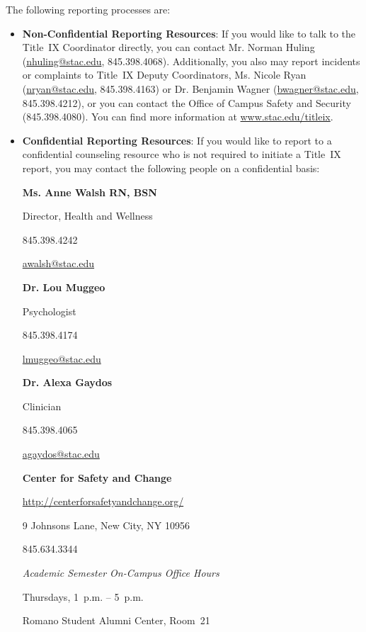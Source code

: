 \documentclass[11pt,letterpaper]{article}
\begin{document}
The following reporting processes are:
	\begin{itemize}
	\item {\bfseries Non-Confidential Reporting Resources}: If you would like to talk to the Title~IX Coordinator directly, you can contact Mr. Norman Huling (\href{mailto:nhuling@stac.edu}{nhuling@stac.edu}, 845.398.4068). Additionally, you also may report incidents or complaints to Title~IX Deputy Coordinators, Ms. Nicole Ryan (\href{mailto:nryan@stac.edu}{nryan@stac.edu}, 845.398.4163) or Dr. Benjamin Wagner (\href{mailto:bwagner@stac.edu}{bwagner@stac.edu}, 845.398.4212), or you can contact the Office of Campus Safety and Security (845.398.4080). You can find more information at \url{www.stac.edu/titleix}.
	
	\item {\bfseries Confidential Reporting Resources}: If you would like to report  to a confidential counseling resource who is not required to initiate a Title~IX report, you may contact the following people on a confidential basis: 
	
	\hspace{0.30cm}\begin{minipage}[t]{0.41\textwidth}
	{\bfseries Ms. Anne Walsh RN, BSN} \par
	Director, Health and Wellness \par
	845.398.4242 \par
	\href{mailto:awalsh@stac.edu}{awalsh@stac.edu}
	\end{minipage}\begin{minipage}[t]{0.30\textwidth}
	{\bfseries Dr. Lou Muggeo} \par
	Psychologist \par
	845.398.4174 \par
	\href{mailto:lmuggeo@stac.edu}{lmuggeo@stac.edu}
        \end{minipage}\begin{minipage}[t]{0.30\textwidth} 
 	{\bfseries Dr. Alexa Gaydos} \par
	Clinician \par
	845.398.4065 \par
	\href{mailto:agaydos@stac.edu}{agaydos@stac.edu}
        \end{minipage} 
        
        \begin{center}
        \begin{minipage}[t]{0.45\textwidth} 
	{\bfseries Center for Safety and Change} \par
	\url{http://centerforsafetyandchange.org/} \par
	9 Johnsons Lane, New City, NY 10956 \par
	845.634.3344 \par \vspace{0.2cm}
	{\itshape Academic Semester On-Campus Office Hours} \par
	Thursdays, 1~p.m. -- 5~p.m. \par
	Romano Student Alumni Center, Room~21
        \end{minipage} 
        \end{center}
\end{itemize} \pspace
\end{document}
